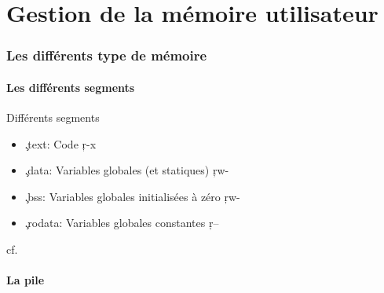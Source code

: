 %
%
%

\part{Gestion de la mémoire utilisateur}

\begin{frame}
  \partpage
\end{frame}

\begin{frame}
  \tableofcontents[currentpart]
\end{frame}

\section{Les différents type de mémoire}

\subsection{Les différents segments}

\begin{frame}[fragile=singleslide]{Différents segments}
  \begin{itemize}
  \item \c{.text}: Code \c{r-x}
  \item \c{.data}: Variables globales (et statiques) \c{rw-}
  \item \c{.bss}: Variables globales initialisées à zéro \c{rw-}
  \item \c{.rodata}: Variables globales constantes \c{r--}
  \end{itemize}
  cf. 
\end{frame}

\subsection{La pile}

